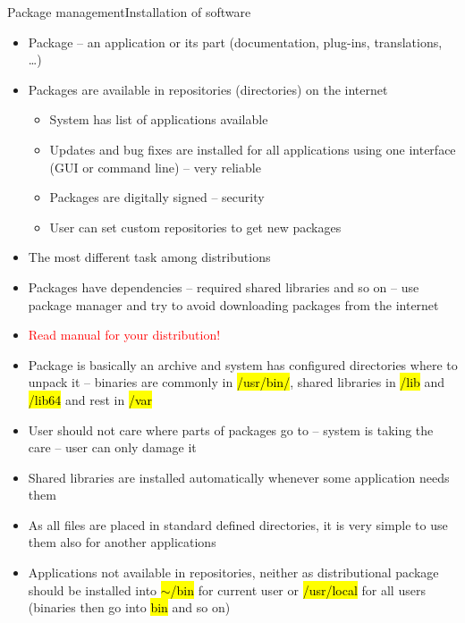 \documentclass[compress, ucs, xelatex, 11pt, xcolor=svgnames,
  hyperref={
    bookmarks=true,
    unicode=true,
    colorlinks=true,
    pdftitle={Linux, command line and MetaCentrum},
    plainpages=false,
    pdfauthor={Vojtech Zeisek},
    pdfsubject={Course about use of Linux command line, writing shell scripts and using MetaCentrum of CESNET},
    pdfcreator={XeLaTeX},
    pdfkeywords={Linux, GNU, BASH, shell, command line, MetaCentrum},
    linkcolor=Red,
    anchorcolor=Blue,
    citecolor=Purple,
    filecolor=DodgerBlue,
    menucolor=DarkOrchid,
    urlcolor=DeepSkyBlue,
    pdftex},
  url={hyphens, lowtilde} %
  ]{beamer}
\renewcommand{\texttt}[1]{\hl{\ttfamily #1}}
\renewcommand{\alert}[1]{\textcolor{red}{#1}}
\begin{document}
\begin{frame}[allowframebreaks]{Package management}{Installation of software}
  \begin{itemize}
    \item Package -- an application or its part (documentation, plug-ins, translations, \ldots)
    \item Packages are available in repositories (directories) on the internet
    \begin{itemize}
      \item System has list of applications available
      \item Updates and bug fixes are installed for all applications using one interface (GUI or command line) -- very reliable
      \item Packages are digitally signed -- security
      \item User can set custom repositories to get new packages
    \end{itemize}
    \item The most different task among distributions
    \item Packages have dependencies -- required shared libraries and so on -- use package manager and try to avoid downloading packages from the internet
    \item \alert{Read manual for your distribution!}
    \item Package is basically an archive and system has configured directories where to unpack it -- binaries are commonly in \texttt{/usr/bin/}, shared libraries in \texttt{/lib} and \texttt{/lib64} and rest in \texttt{/var}
    \item User should not care where parts of packages go to -- system is taking the care -- user can only damage it
    \item Shared libraries are installed automatically whenever some application needs them
    \item As all files are placed in standard defined directories, it is very simple to use them also for another applications
    \item Applications not available in repositories, neither as distributional package should be installed into \texttt{$\sim$/bin} for current user or \texttt{/usr/local} for all users (binaries then go into \texttt{bin} and so on)
  \end{itemize}
\end{frame}
\end{document}
